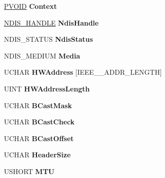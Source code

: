 \begin{DoxyCompactItemize}
\hyperlink{interfacevoid}{P\+V\+O\+ID} {\bfseries Context}
\item 
\mbox{\label{struct_l_a_n___a_d_a_p_t_e_r_ab69f4d2a13274dad4634a5f94e6222a0}} 
\hyperlink{interfacevoid}{N\+D\+I\+S\+\_\+\+H\+A\+N\+D\+LE} {\bfseries Ndis\+Handle}
\item 
\mbox{\label{struct_l_a_n___a_d_a_p_t_e_r_a97a57bef853b46e751c1aa26d859d6c7}} 
N\+D\+I\+S\+\_\+\+S\+T\+A\+T\+US {\bfseries Ndis\+Status}
\item 
\mbox{\label{struct_l_a_n___a_d_a_p_t_e_r_ad02b82797ab14442a8d2a643c65ba8a8}} 
N\+D\+I\+S\+\_\+\+M\+E\+D\+I\+UM {\bfseries Media}
\item 
\mbox{\label{struct_l_a_n___a_d_a_p_t_e_r_a50c327fe1684ad23e6d9fed186cdc95e}} 
U\+C\+H\+AR {\bfseries H\+W\+Address} \mbox{[}I\+E\+E\+E\+\_\+\_\+\+A\+D\+D\+R\+\_\+\+L\+E\+N\+G\+TH\mbox{]}
\item 
\mbox{\label{struct_l_a_n___a_d_a_p_t_e_r_aa26674d628721a2af6aa0e1ee42cd7ae}} 
U\+I\+NT {\bfseries H\+W\+Address\+Length}
\item 
\mbox{\label{struct_l_a_n___a_d_a_p_t_e_r_ac68ee30fa408a23eb98967026fd0d842}} 
U\+C\+H\+AR {\bfseries B\+Cast\+Mask}
\item 
\mbox{\label{struct_l_a_n___a_d_a_p_t_e_r_ace97260b9fbe21f10e01f631a338deea}} 
U\+C\+H\+AR {\bfseries B\+Cast\+Check}
\item 
\mbox{\label{struct_l_a_n___a_d_a_p_t_e_r_ad201d9a0ff4a16a6514a6ed4e5ef89e2}} 
U\+C\+H\+AR {\bfseries B\+Cast\+Offset}
\item 
\mbox{\label{struct_l_a_n___a_d_a_p_t_e_r_a733b9cf37d36599dcbe4f17615b166de}} 
U\+C\+H\+AR {\bfseries Header\+Size}
\item 
\mbox{\label{struct_l_a_n___a_d_a_p_t_e_r_a7dcf3b012349937ff1393ae216632780}} 
U\+S\+H\+O\+RT {\bfseries M\+TU}

\end{DoxyCompactItemize}
